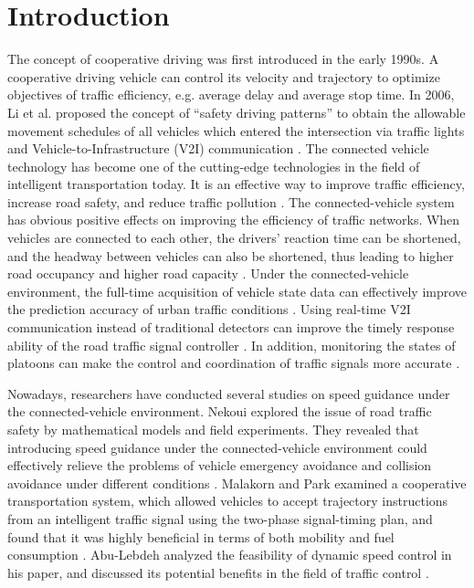 \documentclass[10.5pt,compsoc]{TsT}
\theoremstyle{mystyle}
\newcommand{\upcite}[1]{\textsuperscript{\cite{#1}}}
\begin{document}
{\section{Introduction}
\label{s:introduction}
\noindent
The concept of cooperative driving was first introduced in the early
1990s. A cooperative driving vehicle can control its velocity and
trajectory to optimize objectives of traffic efficiency, e.g. average
delay and average stop time. In 2006, Li et al. proposed the concept of
``safety driving patterns'' to obtain the allowable movement schedules
of all vehicles which entered the intersection via traffic lights and
Vehicle-to-Infrastructure (V2I) communication \upcite{1,2}. 
The connected vehicle technology has become one of the
cutting-edge technologies in the field of intelligent transportation
today. It is an effective way to improve traffic efficiency, increase
road safety, and reduce traffic pollution \upcite{3}. The
connected-vehicle system has obvious positive effects on improving the
efficiency of traffic networks. When vehicles are connected to each
other, the drivers' reaction time can be shortened, and the headway
between vehicles can also be shortened, thus leading to higher road
occupancy and higher road capacity \upcite{4}. Under the
connected-vehicle environment, the full-time acquisition of vehicle
state data can effectively improve the prediction accuracy of urban
traffic conditions \upcite{5}. Using real-time V2I
communication instead of traditional detectors can improve the timely
response ability of the road traffic signal controller
\upcite{6}. In addition, monitoring the states of
platoons can make the control and coordination of traffic signals more
accurate \upcite{6}.

Nowadays, researchers have conducted several studies on speed guidance
under the connected-vehicle environment. Nekoui explored the issue of
road traffic safety by mathematical models and field experiments. They
revealed that introducing speed guidance under the connected-vehicle
environment could effectively relieve the problems of vehicle emergency
avoidance and collision avoidance under different conditions
\upcite{7}. Malakorn and Park examined a cooperative
transportation system, which allowed vehicles to accept trajectory
instructions from an intelligent traffic signal using the two-phase
signal-timing plan, and found that it was highly beneficial in terms of
both mobility and fuel consumption \upcite{8}. Abu-Lebdeh
analyzed the feasibility of dynamic speed control in his paper, and
discussed its potential benefits in the field of traffic control
\upcite{9}.

}
\end{document}

